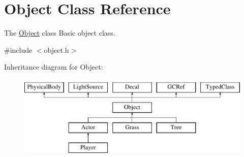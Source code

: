 \hypertarget{classObject}{}\section{Object Class Reference}
\label{classObject}


The \hyperlink{classObject}{Object} class Basic object class.  




{\ttfamily \#include $<$object.\+h$>$}

Inheritance diagram for Object\+:\begin{figure}[H]
\begin{center}
\leavevmode
\includegraphics[height=4.000000cm]{classObject}
\end{center}
\end{figure}

